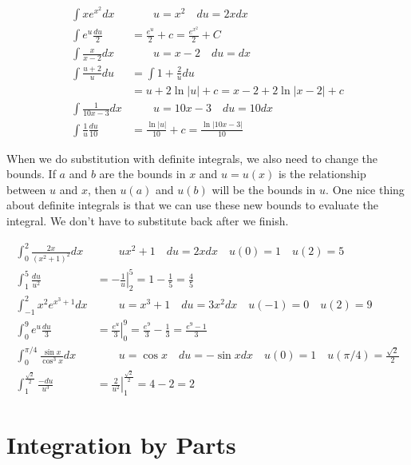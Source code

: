 \documentclass[fleqn]{report}
\begin{document}
\begin{example}
\begin{align*}
\int xe^{x^2} dx & \quad \quad u=x^2 \quad du = 2xdx \\
\int e^u \frac{du}{2} & = \frac{e^u}{2} + c = \frac{e^{x^2}}{2} +
C \\
\int \frac{x}{x-2} dx & \quad \quad u = x-2 \quad du = dx \\
\int \frac{u+2}{u} du & = \int 1 + \frac{2}{u} du \\
& = u + 2 \ln |u| + c = x - 2 + 2\ln|x-2| + c \\
\int \frac{1}{10x-3} dx & \quad \quad u = 10x-3 \quad du = 10dx
\\
\int \frac{1}{u} \frac{du}{10} & = \frac{\ln |u|}{10} + c =
\frac{ \ln| 10x -3 |}{10}
\end{align*}
\end{example}

When we do substitution with definite integrals, we also need
to change the bounds. If $a$ and $b$ are the bounds in $x$
and $u = u(x)$ is the relationship between $u$ and $x$, then
$u(a)$ and $u(b)$ will be the bounds in $u$. One nice thing
about definite integrals is that we can use these new bounds
to evaluate the integral. We don't have to
substitute back after we finish. 

\begin{example}
\begin{align*}
\int_0^2 \frac{2x}{(x^2+1)^2} dx & \quad \quad u x^2+1 \quad du
= 2xdx \quad u(0) = 1 \quad u(2) = 5 \\
\int_1^5 \frac{du}{u^2} & = \left. -\frac{1}{u} \right|_2^5 =
1 - \frac{1}{5} = \frac{4}{5} \\
\int_{-1}^2 x^2 e^{x^3+1} dx & \quad \quad u = x^3+1 \quad du =
3x^2dx \quad u(-1) = 0 \quad u(2) = 9 \\
\int_0^9 e^u \frac{du}{3} & = \left. \frac{e^u}{3} \right|_0^9 =
\frac{e^9}{3} - \frac{1}{3} = \frac{e^9-1}{3} \\
\int_0^{\pi/4} \frac{\sin x}{\cos^3 x} dx & \quad \quad u = \cos
x \quad du = -\sin x dx \quad u(0) = 1 \quad u(\pi/4) =
\frac{\sqrt{2}}{2} \\
\int_1^{\frac{\sqrt{2}}{2}} \frac{-du}{u^3} & = \left.
\frac{2}{u^2} \right|_1^{\frac{\sqrt{2}}{2}} = 4-2 = 2
\end{align*}
\end{example}

\section{Integration by Parts}
\label{parts}
\end{document}
